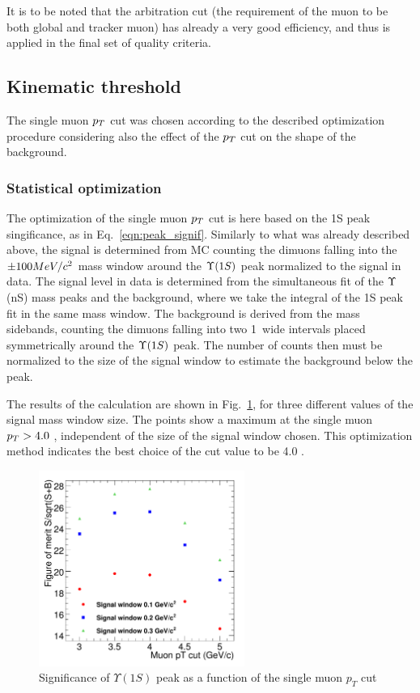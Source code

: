 It is to be noted that the arbitration cut (the requirement of the muon to be both  
global and tracker muon) has already a very good efficiency, and thus is applied in the final set of quality criteria.


\subsection{Kinematic threshold}
\label{sec:shoulder}

The single muon $p_T$ cut was chosen according to the described optimization procedure considering also the effect of the $p_T$ cut on the shape of the background.

\subsubsection{Statistical optimization}

The optimization of the single muon $p_T$ cut is here based on the 1S peak singificance, as in Eq.~\ref{eqn:peak_signif}. Similarly to what was already described above,   
the signal is determined from MC counting the dimuons falling into the $\pm 100 MeV/c^{2}$ mass window around the $\Upsilon(1S)$ peak normalized to the signal in data. 
The signal level in data is determined from the simultaneous fit of the $\Upsilon$(nS) mass peaks and the background, where we take the integral of the 1S peak fit in the same mass window.
The background is derived from the mass sidebands, counting the dimuons falling into two 1~\GeVcc wide intervals placed symmetrically around the $\Upsilon(1S)$ peak. The number of counts then must be normalized to the size of the signal window to estimate the background below the peak.

The results of the calculation are shown in Fig.~\ref{fig:mu_pt_significance}, for three different values of the signal mass window size. 
The points show a maximum at the single muon $p_T>4.0$ \GeVc, independent of the size of the signal window chosen. 
This optimization method indicates the best choice of the cut value to be 4.0 \GeVc.
%
\begin{figure}[h!]
 \begin{center}
    \includegraphics[angle=0,width=0.6\textwidth]{chap_YInPbPbColl2011_figures/MuonPtFom1}
    \caption{Significance of $\Upsilon(1S)$ peak as a function of the single muon $p_T$ cut}
    \label{fig:mu_pt_significance}
 \end{center}
\end{figure}

